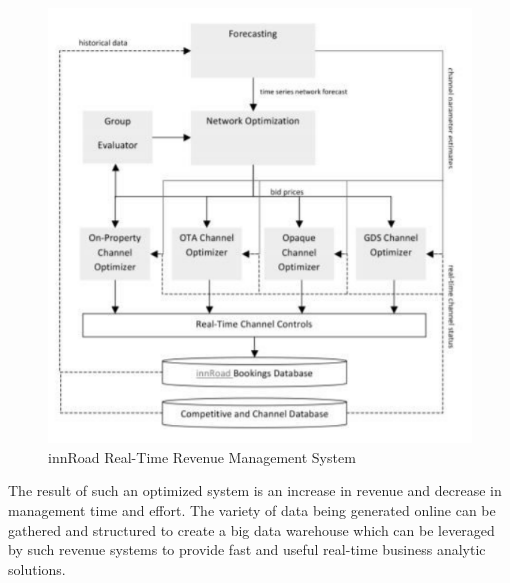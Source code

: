 \documentclass[sigconf]{acmart}
\begin{document}
\begin{figure}
	\includegraphics[width=\columnwidth]{images/innRoad.pdf}
	\caption{innRoad Real-Time Revenue Management System \cite {bigdatarevenue09}}
\end{figure}

The result of such an optimized system is an increase in revenue and decrease in management time and effort. The variety of data being generated online can be gathered and structured to create a big data warehouse which can be leveraged by such revenue systems to provide fast and useful real-time business analytic solutions.
\end{document}
